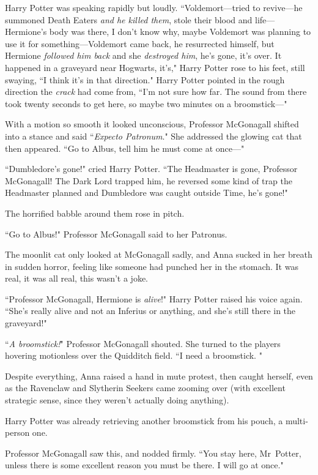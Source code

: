 Harry Potter was speaking rapidly but loudly. ``Voldemort—tried to revive—he summoned Death Eaters \emph{and he killed them}, stole their blood and life—Hermione's body was there, I don't know why, maybe Voldemort was planning to use it for something—Voldemort came back, he resurrected himself, but Hermione \emph{followed him back} and she \emph{destroyed him}, he's gone, it's over. It happened in a graveyard near Hogwarts, it's," Harry Potter rose to his feet, still swaying, ``I think it's in that direction." Harry Potter pointed in the rough direction the \emph{crack} had come from, ``I'm not sure how far. The sound from there took twenty seconds to get here, so maybe two minutes on a broomstick—"

With a motion so smooth it looked unconscious, Professor McGonagall shifted into a stance and said ``\emph{Expecto Patronum}." She addressed the glowing cat that then appeared. ``Go to Albus, tell him he must come at once—"

``Dumbledore's gone!" cried Harry Potter. ``The Headmaster is gone, Professor McGonagall! The Dark Lord trapped him, he reversed some kind of trap the Headmaster planned and Dumbledore was caught outside Time, he's gone!"

The horrified babble around them rose in pitch.

``Go to Albus!" Professor McGonagall said to her Patronus.

The moonlit cat only looked at McGonagall sadly, and Anna sucked in her breath in sudden horror, feeling like someone had punched her in the stomach. It was real, it was all real, this wasn't a joke.

``Professor McGonagall, Hermione is \emph{alive}!" Harry Potter raised his voice again. ``She's really alive and not an Inferius or anything, and she's still there in the graveyard!"

``\emph{A broomstick!}" Professor McGonagall shouted. She turned to the players hovering motionless over the Quidditch field. ``I need a broomstick. "

Despite everything, Anna raised a hand in mute protest, then caught herself, even as the Ravenclaw and Slytherin Seekers came zooming over (with excellent strategic sense, since they weren't actually doing anything).

Harry Potter was already retrieving another broomstick from his pouch, a multi-person one.

Professor McGonagall saw this, and nodded firmly. ``You stay here, Mr~Potter, unless there is some excellent reason you must be there. I will go at once."

